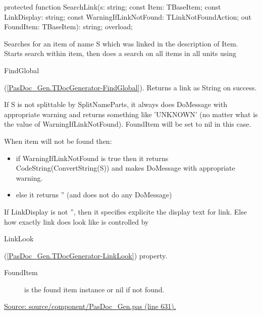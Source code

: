 \documentclass{report}
\newif\ifpdf
\begin{document}
\label{PasDoc_Gen.TDocGenerator-SearchLink}
\begin{list}{}{
\setlength{\itemindent}{0cm}
\setlength{\listparindent}{0cm}
\setlength{\leftmargin}{\evensidemargin}
\addtolength{\leftmargin}{\tmplength}
\settowidth{\labelsep}{X}
\addtolength{\leftmargin}{\labelsep}
\setlength{\labelwidth}{\tmplength}
}
\item[\textbf{Declaration}\hfill]
\ifpdf
\begin{flushleft}
\fi
\begin{ttfamily}
protected function SearchLink(s: string; const Item: TBaseItem; const LinkDisplay: string; const WarningIfLinkNotFound: TLinkNotFoundAction; out FoundItem: TBaseItem): string; overload;\end{ttfamily}

\ifpdf
\end{flushleft}
\fi

\par
\item[\textbf{Description}]
Searches for an item of name S which was linked in the description of Item. Starts search within item, then does a search on all items in all units using \begin{ttfamily}FindGlobal\end{ttfamily}(\ref{PasDoc_Gen.TDocGenerator-FindGlobal}). Returns a link as String on success.

If S is not splittable by SplitNameParts, it always does DoMessage with appropriate warning and returns something like 'UNKNOWN' (no matter what is the value of WarningIfLinkNotFound). FoundItem will be set to nil in this case.

When item will not be found then: \begin{itemize}
\item  if WarningIfLinkNotFound is true then it returns CodeString(ConvertString(S)) and makes DoMessage with appropriate warning.
\item else it returns '' (and does not do any DoMessage)
\end{itemize}

If LinkDisplay is not '', then it specifies explicite the display text for link. Else how exactly link does look like is controlled by \begin{ttfamily}LinkLook\end{ttfamily}(\ref{PasDoc_Gen.TDocGenerator-LinkLook}) property.

\par
\item[\textbf{Parameters}]
\begin{description}
\item[FoundItem] is the found item instance or nil if not found.
\end{description}
\par
\href{https://github.com/pasdoc/pasdoc/blob/master/source/component/PasDoc_Gen.pas#L631}{Source: source/component/PasDoc{\_}Gen.pas (line 631).}

\end{list}
\end{document}
